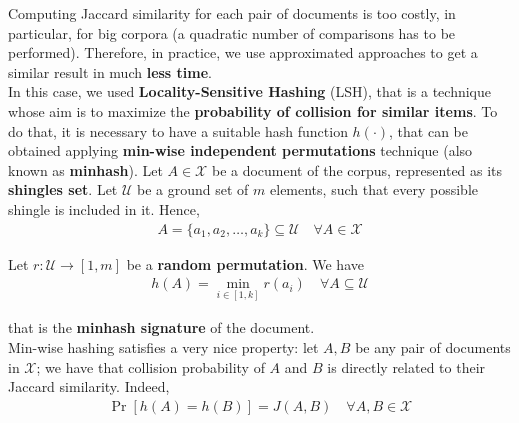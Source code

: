Computing Jaccard similarity for each pair of documents is too costly, in particular, for big corpora (a quadratic number of comparisons has to be performed).
Therefore, in practice, we use approximated approaches to get a similar result in much \textbf{less time}.\\
In this case, we used \textbf{Locality-Sensitive Hashing} (LSH)\cite{lsh}, that is a technique whose aim is to maximize the \textbf{probability of collision for similar items}. To do that, it is necessary to have a suitable hash function $h(\cdot)$, that can be obtained applying \textbf{min-wise independent permutations}\cite{minhash} technique (also known as \textbf{minhash}).
Let $A \in \mathcal{X}$ be a document of the corpus, represented as its \textbf{shingles set}. Let $\mathcal{U}$ be a ground set of $m$ elements, such that every possible shingle is included in it. Hence,
\begin{align*}
A = \{a_1, a_2, \ldots, a_k\} \subseteq \mathcal{U} \quad \forall A \in \mathcal{X}
\end{align*}

\noindent Let $r: \mathcal{U} \longrightarrow [1,m]$ be a \textbf{random permutation}. We have
\begin{align}
h(A) = \min_{i \in [1,k]} r(a_i) \quad \forall A \subseteq \mathcal{U} \label{minhash}
\end{align}

\noindent that is the \textbf{minhash signature} of the document.\\
Min-wise hashing satisfies a very nice property: let $A,B$ be any pair of documents in $\mathcal{X}$; we have that collision probability of $A$ and $B$ is directly related to their Jaccard similarity. Indeed,
\begin{align}
\Pr[h(A) = h(B)] = J(A,B) \quad \forall A,B \in \mathcal{X} \label{lsh_prob}
\end{align}

